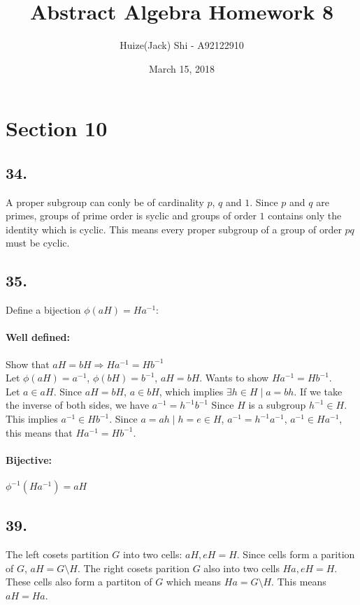 \documentclass{article}
\title {Abstract Algebra Homework 8}
\date {March 15, 2018}
\author {Huize(Jack) Shi - A92122910}
\begin{document}
\maketitle

\section*{Section 10}
\subsection*{34. }
A proper subgroup can conly be of cardinality $p$, $q$ and $1$. Since $p$ and $q$
are primes, groups of prime order is syclic and groups of order $1$ contains only
the identity which is cyclic. This means every proper subgroup of a group of
order $pq$ must be cyclic.

\subsection*{35. }
Define a bijection $\phi(aH) = Ha^{-1}$:
\paragraph{Well defined: }
Show that $aH = bH \Rightarrow Ha^{-1} = Hb^{-1}$\\
Let $\phi(aH) = a^{-1}$, $\phi(bH) = b^{-1}$, $aH = bH$. Wants to show
$Ha^{-1} = Hb^{-1}$.\\
Let $a\in aH$. Since $aH = bH$, $a\in bH$, which implies $\exists h \in H \mid
a=bh$. If we take the inverse of both sides, we have $a^{-1} = h^{-1}b^{-1}$
Since $H$ is a subgroup $h^{-1} \in H$. This implies $a^{-1} \in Hb^{-1}$. Since 
$a = ah \mid h=e \in H$, $a^{-1} = h^{-1}a^{-1}$, $a^{-1} \in Ha^{-1}$, this
means that $Ha^{-1} = Hb^{-1}$.

\paragraph{Bijective: }$\phi^{-1}(Ha^{-1}) = aH$


\subsection*{39. }
The left cosets partition $G$ into two cells: $aH, eH=H$. Since cells form a
parition of $G$, $aH = G \setminus H$. The right cosets parition $G$ also into two cells 
$Ha, eH=H$. These cells also form a partiton of $G$ which means $Ha = G
\setminus H$. This means $aH = Ha$.
\end{document}
